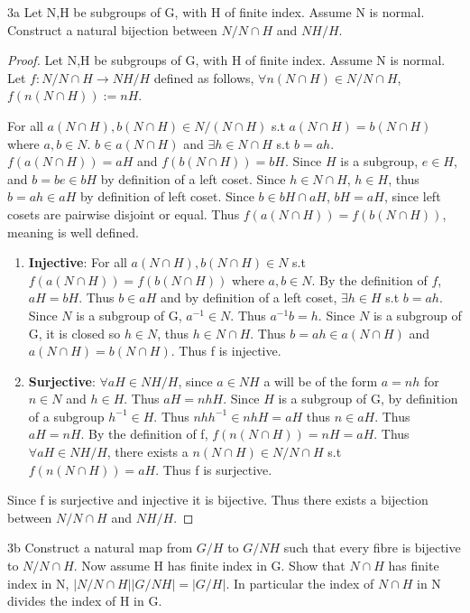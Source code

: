\documentclass{article}
\begin{document}
\begin{PROB}{3a}\label{Problem 3a.}
    Let N,H be subgroups of G, with H of finite index. Assume N is normal. Construct a natural bijection between $N/N \cap H$ and $NH/H$. 
\end{PROB}
\begin{proof}
    Let N,H be subgroups of G, with H of finite index. Assume N is normal. Let $f: N/N\cap H \to NH/H$ defined as follows, $\forall n(N \cap H) \in N/N\cap H$, $f(n(N \cap H)) := nH$. 
    
    For all $a(N \cap H), b(N \cap H) \in N/(N \cap H)$ s.t $a(N \cap H) = b(N \cap H)$ where $a, b \in N$. $b \in a(N \cap H)$ and $\exists h \in N \cap H$ s.t $b = ah$. $f(a(N \cap H)) = aH$ and $f(b(N \cap H)) = bH$. Since $H$ is a subgroup, $e \in H$, and $b = be \in bH$ by definition of a left coset. Since $h \in N \cap H$, $h \in H$, thus $b = ah \in aH$ by definition of left coset. Since $b \in bH \cap aH$, $bH = aH$, since left cosets are pairwise disjoint or equal. Thus $f(a(N \cap H)) = f(b(N \cap H))$, meaning is well defined.

    \begin{enumerate}{}
        \item \textbf{Injective}: For all $a(N \cap H), b(N \cap H) \in N$ s.t $f(a(N \cap H)) = f(b(N \cap H))$ where $a, b \in N$. By the definition of $f$, $aH = bH$. Thus $b \in aH$ and by definition of a left coset, $\exists h \in H$ s.t $b = ah$. Since $N$ is a subgroup of G, $a^{-1} \in N$. Thus $a^{-1}b = h$. Since $N$ is a subgroup of G, it is closed so $h \in N$, thus $h \in N \cap H$. Thus $b = ah \in a(N \cap H)$ and $a(N \cap H) = b(N \cap H)$. Thus f is injective.
        \item \textbf{Surjective}: $\forall aH \in NH/H$, since $a \in NH$ a will be of the form $a = nh$ for $n \in N$ and $h \in H$. Thus $aH = nhH$. Since $H$ is a subgroup of G, by definition of a subgroup $h^{-1} \in H$. Thus $nhh^{-1} \in nhH = aH$ thus $n \in aH$. Thus $aH = nH$. By the definition of f, $f(n(N \cap H)) = nH = aH$. Thus $\forall aH \in NH/H$, there exists a $n(N \cap H) \in N/N\cap H$ s.t $f(n(N \cap H)) = aH$. Thus f is surjective. 
    \end{enumerate}

    Since f is surjective and injective it is bijective. Thus there exists a bijection between $N/N \cap H$ and $NH/H$.
\end{proof}
\begin{PROB}{3b}\label{Problem 3b.}
    Construct a natural map from $G/H$ to $G/NH$ such that every fibre is bijective to $N/N \cap H$.  Now assume H has finite index in G. Show that $N \cap H$ has finite index in N, $|N/N \cap H| |G/NH| = |G/H|$. In particular the index of $N \cap H$ in N divides the index of H in G. 
\end{PROB}
\end{document}
